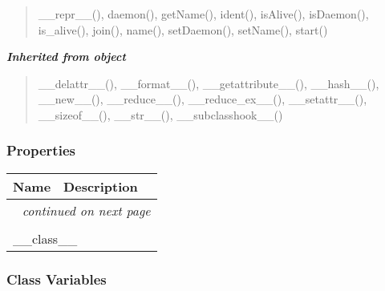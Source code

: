 \begin{quote}
\_\_repr\_\_(), daemon(), getName(), ident(), isAlive(), isDaemon(), is\_alive(), join(), name(), setDaemon(), setName(), start()
\end{quote}

\large{\textbf{\textit{Inherited from object}}}

\begin{quote}
\_\_delattr\_\_(), \_\_format\_\_(), \_\_getattribute\_\_(), \_\_hash\_\_(), \_\_new\_\_(), \_\_reduce\_\_(), \_\_reduce\_ex\_\_(), \_\_setattr\_\_(), \_\_sizeof\_\_(), \_\_str\_\_(), \_\_subclasshook\_\_()
\end{quote}


  \subsubsection{Properties}

    \vspace{-1cm}
\hspace{\varindent}\begin{longtable}{|p{\varnamewidth}|p{\vardescrwidth}|l}
\cline{1-2}
\cline{1-2} \centering \textbf{Name} & \centering \textbf{Description}& \\
\cline{1-2}
\endhead\cline{1-2}\multicolumn{3}{r}{\small\textit{continued on next page}}\\\endfoot\cline{1-2}
\endlastfoot\multicolumn{2}{|l|}{\textit{Inherited from object}}\\
\multicolumn{2}{|p{\varwidth}|}{\raggedright \_\_class\_\_}\\
\cline{1-2}
\end{longtable}



  \subsubsection{Class Variables}

